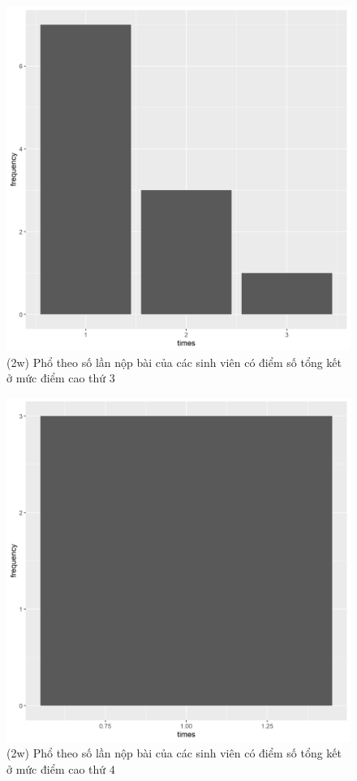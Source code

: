 \documentclass[a4paper]{article}
\theoremstyle{definition}
\begin{document}
\begin{figure}[!ht]
    \centering
    \includegraphics[scale=0.4]{Pics/q2w-3-file1.PNG}
    \caption{(2w) Phổ theo số lần nộp bài của các sinh viên có điểm số tổng kết ở mức điểm cao thứ $3$}
    \label{fig:my_label}
\end{figure}
\begin{figure}[!ht]
    \centering
    \includegraphics[scale=0.4]{Pics/q2w-4-file1.png}
    \caption{(2w) Phổ theo số lần nộp bài của các sinh viên có điểm số tổng kết ở mức điểm cao thứ $4$}
    \label{fig:my_label}
\end{figure}
\end{document}
